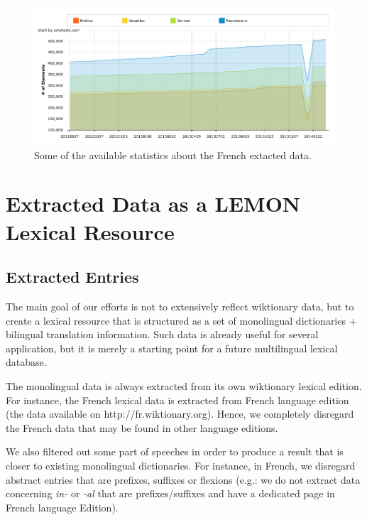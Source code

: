 \documentclass[10pt, a4paper]{article}
\begin{document}
\begin{figure}[htb]
	\begin{center}
		\includegraphics[width=\textwidth]{french.png}
	\end{center}
	\caption{Some of the available statistics about the French extacted data.}
	\label{fig:french}
\end{figure}

\section{Extracted Data as a LEMON Lexical Resource}

\subsection{Extracted Entries}

The main goal of our efforts is not to extensively reflect wiktionary data, but to create a lexical resource that is structured as a set of monolingual dictionaries + bilingual translation information. Such data is already useful for several application, but it is merely a starting point for a future multilingual lexical database.

The monolingual data is always extracted from its own wiktionary lexical edition. For instance, the French lexical data is extracted from French language edition (the data available on http://fr.wiktionary.org). Hence, we completely disregard the French data that may be found in other language editions.

We also filtered out some part of speeches in order to produce a result that is closer to existing monolingual dictionaries. For instance, in French, we disregard abstract entries that are prefixes, suffixes or flexions (e.g.: we do not extract data concerning \textit{in-} or \textit{-al} that are prefixes/suffixes and have a dedicated page in French language Edition). 
\end{document}
